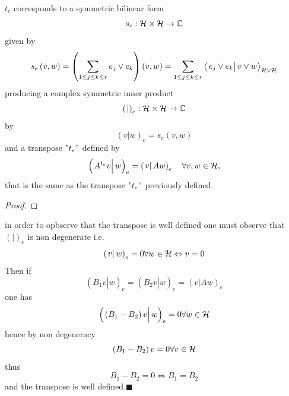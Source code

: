 \begin{lemma}
\label{symmetric bilinear form} $t_{e}$ corresponds to a symmetric bilinear
form 
\begin{equation}
s_{e}:{\cal H}\times {\cal H}\rightarrow {\Bbb C}
\end{equation}%
given by 
\begin{equation}
s_{e}\left( v,w\right) =\left( \sum_{1\leq j\leq k\leq r}e_{j}\vee
e_{k}\right) \left( \stackrel{}{v,w}\right) =\sum_{1\leq j\leq k\leq
r}\left\langle \left. \stackrel{}{e_{j}\vee e_{k}}\right\vert v\vee
w\right\rangle _{{\cal H}\vee {\cal H}}
\end{equation}%
producing a complex symmetric inner product 
\begin{equation}
\left( \left. {}\right\vert \right) _{e}:{\cal H}\times {\cal H}\rightarrow 
{\Bbb C}
\end{equation}
by%
\begin{equation}
\left( \left. \stackrel{}{v}\right\vert w\right) _{e}=s_{e}\left( v,w\right)
\end{equation}%
and a transpose "$t_{e}"$ defined by 
\begin{equation}
\left( \left. \stackrel{}{A^{t_{e}}v}\right\vert w\right) _{e}=\left( \left. 
\stackrel{}{v}\right\vert Aw\right) _{e}\quad \forall v,w\in {\cal H},
\end{equation}%
that is the same as the transpose "$t_{e}"$ previously defined.

\begin{proof}
\end{proof} in order to opbserve that the transpose is well defined one must
observe that $\left( \left. {}\right\vert \right) _{e}$ is non degenerate
i.e. 
\begin{equation}
\left( \left. \stackrel{}{v}\right\vert w\right) _{e}=0\forall w\in {\cal H}%
\Leftrightarrow v=0
\end{equation}%
Then if 
\begin{equation}
\left( \left. \stackrel{}{B_{1}v}\right\vert w\right) _{e}=\left( \left. 
\stackrel{}{B_{2}v}\right\vert w\right) _{e}=\left( \left. \stackrel{}{v}%
\right\vert Aw\right) _{e}
\end{equation}%
one has 
\begin{equation}
\left( \left. \stackrel{}{\left( B_{1}-B_{2}\right) v}\right\vert w\right)
_{e}=0\forall w\in {\cal H}
\end{equation}%
hence by non degeneracy 
\begin{equation}
\left( B_{1}-B_{2}\right) v=0\forall v\in {\cal H}
\end{equation}%
thus 
\begin{equation}
B_{1}-B_{2}=0\Longleftrightarrow B_{1}=B_{2}
\end{equation}%
and the transpose is well defined.$\blacksquare $
\end{lemma}

